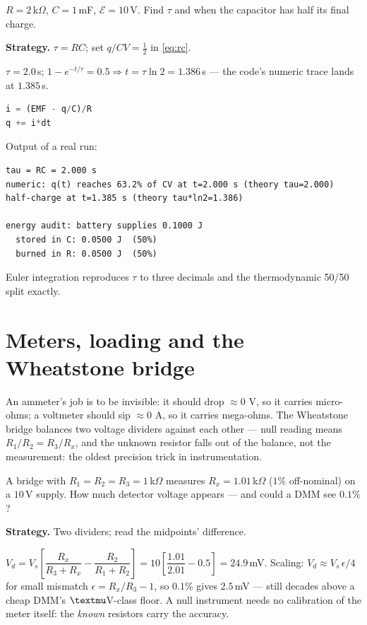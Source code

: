 \begin{example}\label{ex:rchalf}
$R=2$\,k$\Omega$, $C=1$\,mF, $\mathcal E=10$\,V. Find $\tau$ and
when the capacitor has half its final charge.
\par\smallskip
\textbf{Strategy.} $\tau=RC$; set $q/CV=\tfrac12$ in \eqref{eq:rc}.
\begin{solution}
$\tau=2.0$\,s; $1-e^{-t/\tau}=0.5 \Rightarrow t=\tau\ln2=1.386$\,s ---
the code's numeric trace lands at $1.385$\,s. \checkmark
\end{solution}
\end{example}

\begin{lstlisting}[language=Python,caption={\texttt{code/ch12\_rc\_transient.py} --- Euler-integrated RC charge vs analytic; the 50\% audit.},label={lst:rc}]
i = (EMF - q/C)/R
q += i*dt
\end{lstlisting}

Output of a real run:
\begin{lstlisting}[numbers=none]
tau = RC = 2.000 s
numeric: q(t) reaches 63.2% of CV at t=2.000 s (theory tau=2.000)
half-charge at t=1.385 s (theory tau*ln2=1.386)

energy audit: battery supplies 0.1000 J
  stored in C: 0.0500 J  (50%)
  burned in R: 0.0500 J  (50%)
\end{lstlisting}

Euler integration reproduces $\tau$ to three decimals and the
thermodynamic 50/50 split exactly.

\section{Meters, loading and the Wheatstone bridge}\label{sec:cir-eng}

An ammeter's job is to be invisible: it should drop $\approx0$ V, so it
carries micro-ohms; a voltmeter should sip $\approx0$ A, so it carries
mega-ohms. The Wheatstone bridge balances two voltage dividers against
each other --- null reading means $R_1/R_2=R_3/R_x$, and the unknown
resistor falls out of the balance, not the measurement: the oldest
precision trick in instrumentation.

\begin{example}\label{ex:bridge}
A bridge with $R_1=R_2=R_3=1$\,k$\Omega$ measures
$R_x=1.01$\,k$\Omega$ ($1\%$ off-nominal) on a $10$\,V supply. How
much detector voltage appears --- and could a DMM see $0.1\%$?
\par\smallskip
\textbf{Strategy.} Two dividers; read the midpoints' difference.
\begin{solution}
$V_d=V_s\left[\dfrac{R_x}{R_3+R_x}-\dfrac{R_2}{R_1+R_2}\right]
=10\left[\dfrac{1.01}{2.01}-0.5\right]=24.9$\,mV.
Scaling: $V_d\approx V_s\,\epsilon/4$ for small mismatch
$\epsilon=R_x/R_3-1$, so $0.1\%$ gives $2.5$\,mV --- still decades
above a cheap DMM's $\textmu$V-class floor. A null instrument needs
no calibration of the meter itself: the \emph{known} resistors carry
the accuracy. \checkmark
\end{solution}
\end{example}

